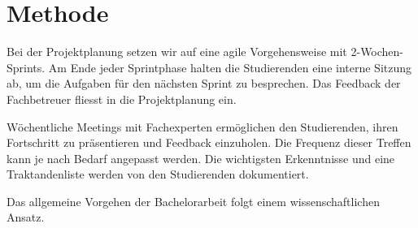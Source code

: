 \section{Methode} %
Bei der Projektplanung setzen wir auf eine agile Vorgehensweise mit 2-Wochen-Sprints. Am Ende jeder Sprintphase halten die Studierenden eine interne Sitzung ab, um die Aufgaben für den nächsten Sprint zu besprechen. Das Feedback der Fachbetreuer fliesst in die Projektplanung ein.

Wöchentliche Meetings mit Fachexperten ermöglichen den Studierenden, ihren Fortschritt zu präsentieren und Feedback einzuholen. Die Frequenz dieser Treffen kann je nach Bedarf angepasst werden. Die wichtigsten Erkenntnisse und eine Traktandenliste werden von den Studierenden dokumentiert.

Das allgemeine Vorgehen der Bachelorarbeit folgt einem wissenschaftlichen Ansatz.